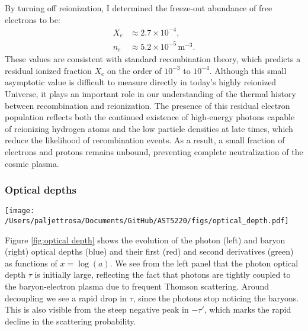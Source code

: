 \documentclass{aa}
\numberwithin{equation}{section}
\numberwithin{table}{section}
\numberwithin{figure}{section}
\begin{document}
By turning off reionization, I determined the freeze-out abundance of free electrons to be:
\begin{align*}
  X_e &\approx 2.7 \times10^{-4},
  \\
  n_e &\approx 5.2 \times10^{-5}\,\text{m}^{-3}.
\end{align*}
These values are consistent with standard recombination theory, which predicts a residual ionized fraction $X_e$ on the order of $10^{-3}$ to $10^{-4}$. Although this small asymptotic value is difficult to measure directly in today's highly reionized Universe, it plays an important role in our understanding of the thermal history between recombination and reionization. The presence of this residual electron population reflects both the continued existence of high-energy photons capable of reionizing hydrogen atoms and the low particle densities at late times, which reduce the likelihood of recombination events. As a result, a small fraction of electrons and protons remains unbound, preventing complete neutralization of the cosmic plasma.



\subsubsection{Optical depths}

\begin{figure*}
  \centering
  \texttt{[image: /Users/paljettrosa/Documents/GitHub/AST5220/figs/optical\_depth.pdf]}
  \caption{The evolution of the optical depth $\tau$ (blue), its first derivative $-\tau'$ (red), and its second derivative $\tau''$ (green) for both photons (left) and baryons (right). 
  The sharp drop in $\tau$ marks photon decoupling, after which photons free-stream. In constrast, the gradual decline in $\tau_b$ indicates the prolonged influence of radiation pressure on baryons during the drag epoch. 
  }\label{fig:optical depth}
\end{figure*}

Figure \ref{fig:optical depth} shows the evolution of the photon (left) and baryon (right) optical depths (blue) and their first (red) and second derivatives (green) as functions of $x = \log (a)$. We see from the left panel that the photon optical depth $\tau$ is initially large, reflecting the fact that photons are tightly coupled to the baryon-electron plasma due to frequent Thomson scattering. Around decoupling we see a rapid drop in $\tau$, since the photons stop noticing the baryons. This is also visible from the steep negative peak in $-\tau'$, which marks the rapid decline in the scattering probability. 
\end{document}
